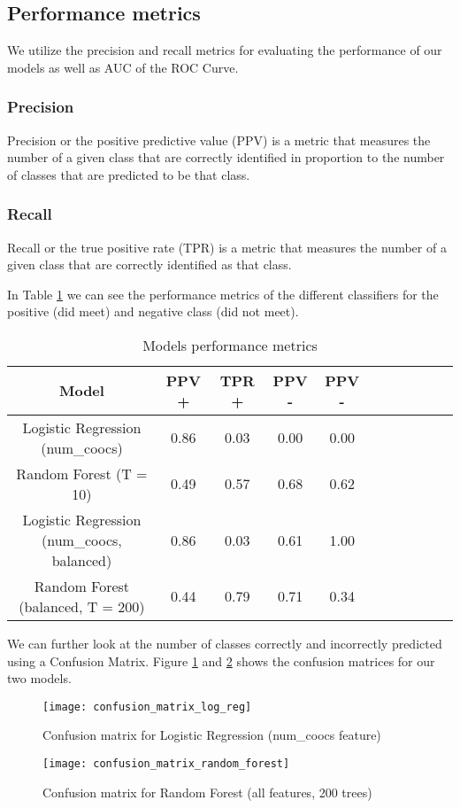 \subsection{Performance metrics}
We utilize the precision and recall metrics for evaluating the performance of our models as well as AUC of the ROC Curve.
\subsubsection{Precision}
Precision or the positive predictive value (PPV) is a metric that measures the number of a given class that are correctly identified in proportion to the number of classes that are predicted to be that class.
\subsubsection{Recall}
Recall or the true positive rate (TPR) is a metric that measures the number of a given class that are correctly identified as that class.

In Table \ref{table:models_performance_report} we can see the performance metrics of the different classifiers for the positive (did meet) and negative class (did not meet).

\begin{table}[H]
\centering
\begin{tabular}{|c|c|c|c|c|c|c|c|c|c|c|}
\hline
\textbf{Model} & \textbf{PPV +} & \textbf{TPR +} & \textbf{PPV -} & \textbf{PPV -}   \\
\hline
Logistic Regression (num\_coocs)          & 0.86 & 0.03 & 0.00 & 0.00       \\
\hline
Random Forest (T = 10)    & 0.49 & 0.57 & 0.68 & 0.62\\
\hline
Logistic Regression (num\_coocs, balanced)          & 0.86 & 0.03 & 0.61 & 1.00      \\
\hline
Random Forest (balanced, T = 200)    & 0.44 & 0.79 & 0.71 & 0.34\\
\hline
\end{tabular}
\caption{Models performance metrics}
\label{table:models_performance_report}
\end{table}

We can further look at the number of classes correctly and incorrectly predicted using a Confusion Matrix. Figure \ref{fig:conf_matrix_log_reg} and \ref{fig:conf_matrix_random_forest} shows the confusion matrices for our two models.

\begin{figure}[H]
    \hspace*{-1.0cm}
    \centering
    \texttt{[image: confusion\_matrix\_log\_reg]}
    \caption{Confusion matrix for Logistic Regression (num\_coocs feature)}
    \label{fig:conf_matrix_log_reg}
\end{figure}
\begin{figure}[H]
    \hspace*{-1.0cm}
    \centering
    \texttt{[image: confusion\_matrix\_random\_forest]}
    \caption{Confusion matrix for Random Forest (all features, 200 trees)}
    \label{fig:conf_matrix_random_forest}
\end{figure}

